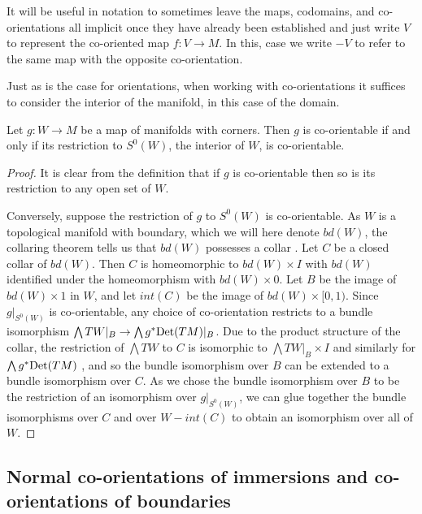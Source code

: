 \begin{notation}\label{N: implicit notation}
	It will be useful in notation to sometimes leave the maps, codomains, and co-orientations all implicit once they have already been established and just write $V$ to represent the co-oriented map $f \colon V \to M$.
	In this, case we write $-V$ to refer to the same map with the opposite co-orientation.
\end{notation}

Just as is the case for orientations, when working with co-orientations it suffices to consider the interior of the manifold, in this case of the domain.

\begin{proposition}\label{P: interior co-orientation}
Let $g \colon W \to M$ be a map of manifolds with corners. Then $g$ is co-orientable if and only if its restriction to $S^0(W)$, the interior of $W$, is co-orientable.
\end{proposition}
\begin{proof}
It is clear from the definition that if $g$ is co-orientable then so is its restriction to any open set of $W$.

Conversely, suppose the restriction of $g$ to $S^0(W)$ is co-orientable. As $W$ is a topological manifold with boundary, which we will here denote $bd(W)$, the collaring theorem tells us that $bd(W)$ possesses a collar \cite[Theorem 2]{Bro62}. Let $C$ be a closed collar of $bd(W)$. Then $C$ is homeomorphic to $bd(W)\times I$ with $bd (W)$ identified under the homeomorphism with $bd(W) \times 0$. Let $B$ be the image of $bd(W) \times 1$ in $W$, and let $int(C)$ be the image of $bd(W) \times [0,1)$. Since $g|_{S^0(W)}$ is co-orientable, any choice of co-orientation restricts to a bundle isomorphism $\bigwedge TW|_B \to \bigwedge g^*{\rm Det}(TM)|_B$. Due to the product structure of the collar, the restriction of $\bigwedge TW$ to $C$ is isomorphic to $\bigwedge TW|_B \times I$ and similarly for $\bigwedge g^*{\rm Det}(TM)$ \cite[Theorem 3.4.4]{Hus94}, and so the bundle isomorphism over $B$ can be extended to a bundle isomorphism over $C$. As we chose the bundle isomorphism over $B$ to be the restriction of an isomorphism over $g|_{S^0(W)}$, we can glue together the bundle isomorphisms over $C$ and over $W-int(C)$ to obtain an isomorphism over all of $W$.
\end{proof}

\subsection{Normal co-orientations of immersions and co-orientations of boundaries}\label{S: normal orientation}


